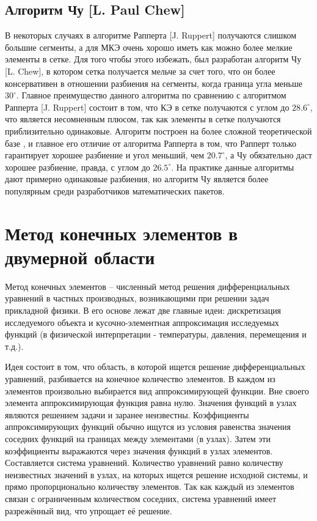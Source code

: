 \documentclass[14pt]{extreport}
\begin{document}
\section{Алгоритм Чу [L. Paul Chew]}

В некоторых случаях в алгоритме Рапперта [J. Ruppert] получаются слишком большие сегменты, а для МКЭ очень хорошо иметь как можно более мелкие элементы в сетке. Для того чтобы этого избежать, был разработан алгоритм Чу [L. Chew], в котором сетка получается мельче за счет того, что он более консервативен в отношении разбиения на сегменты, когда граница угла меньше $30^{\circ}$. Главное преимущество данного алгоритма по сравнению с алгоритмом Рапперта [J. Ruppert] состоит в том, что КЭ в сетке получаются с углом до $28.6^{\circ}$, что является несомненным плюсом, так как элементы в сетке получаются приблизительно одинаковые. Алгоритм построен на более сложной теоретической базе \cite{bib:triangle:chew}, и главное его отличие от алгоритма Рапперта в том, что Рапперт только гарантирует хорошее разбиение и угол меньший, чем $20.7^{\circ}$, а Чу обязательно даст хорошее разбиение, правда, с углом до $26.5^{\circ}$. На практике данные алгоритмы дают примерно одинаковые разбиения, но алгоритм Чу является более популярным среди разработчиков математических пакетов.

\chapter{Метод конечных элементов в двумерной области}

Метод конечных элементов \cite{bib:fem:pankratov, bib:fem:zenkevich} -- численный метод решения дифференциальных уравнений в частных производных, возникающими при решении задач прикладной физики.
	В его основе лежат две главные идеи: дискретизация исследуемого объекта и кусочно-элементная аппроксимация исследуемых функций (в физической интерпретации - температуры, давления, перемещения и т.д.).

Идея состоит в том, что область, в которой ищется решение дифференциальных уравнений, разбивается на конечное количество элементов. В каждом из элементов произвольно выбирается вид аппроксимирующей функции. Вне своего элемента аппроксимирующая функция равна нулю. Значения функций в узлах являются решением задачи и заранее неизвестны. Коэффициенты аппроксимирующих функций обычно ищутся из условия равенства значения соседних функций на границах между элементами (в узлах). Затем эти коэффициенты выражаются через значения функций в узлах элементов. Составляется система уравнений. Количество уравнений равно количеству неизвестных значений в узлах, на которых ищется решение исходной системы, и прямо пропорционально количеству элементов. Так как каждый из элементов связан с ограниченным количеством соседних, система уравнений имеет разрежённый вид, что упрощает её решение. 
\end{document}

